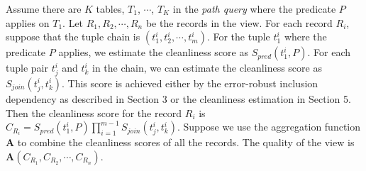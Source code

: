 Assume there are $K$ tables, $T_1$, $\cdots$, $T_K$ in the \emph{path query}
where the predicate $P$ applies on $T_1$. Let $R_1, R_2, \cdots, R_n$ be the
records in the view. For each record $R_i$, suppose that the tuple chain is
$(t^i_1, t^i_2, \cdots, t^i_m)$. For the tuple $t^i_1$ where the predicate $P$
applies, we estimate the cleanliness score as $S_{pred}(t^i_1, P)$. For each
tuple pair $t^i_j$ and $t^i_k$ in the chain, we can estimate the cleanliness
score as $S_{join}(t^i_j,t^i_k)$. This score is achieved either by the
error-robust inclusion dependency as described in Section 3 or the cleanliness
estimation in Section 5. Then the cleanliness score for the record $R_i$ is
$C_{R_i}=S_{pred}(t^i_1,P)\prod_{i=1}^{m-1}S_{join}(t^i_j,t^i_k)$. Suppose we
use the aggregation function $\mathbf{A}$ to combine the cleanliness scores of
all the records. The quality of the view is $\mathbf{A}(C_{R_1}, C_{R_2},
\cdots, C_{R_n})$.


\fi



